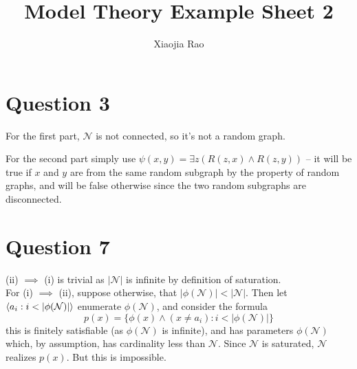 \documentclass[a4paper]{article}
\begin{document}
\title{Model Theory Example Sheet 2}

\author{Xiaojia Rao}

\maketitle

\setcounter{secnumdepth}{0}

\section{Question 3}

For the first part, $\mathcal{N}$ is not connected, so it's not a random graph.

For the second part simply use $\psi(x,y) = \exists z (R(z,x) \wedge R(z,y))$ -- it will be true if $x$ and $y$ are from the same random subgraph by the property of random graphs, and will be false otherwise since the two random subgraphs are disconnected.

\section{Question 7}

(ii) $\implies$ (i) is trivial as $|\mathcal{N}|$ is infinite by definition of saturation.\\
For (i) $\implies$ (ii), suppose otherwise, that $|\phi(\mathcal{N})| < |\mathcal{N}|$. Then let $\bra a_i:i<|\phi(\mathcal{N})|\ket$ enumerate $\phi(\mathcal{N})$, and consider the formula
$$p(x) = \{\phi(x) \wedge (x \neq a_i): i < |\phi(\mathcal{N})|\}$$
this is finitely satisfiable (as $\phi(\mathcal{N})$ is infinite), and has parameters $\phi(\mathcal{N})$ which, by assumption, has cardinality less than $\mathcal{N}$. Since $\mathcal{N}$ is saturated, $\mathcal{N}$ realizes $p(x)$. But this is impossible.
\end{document}
